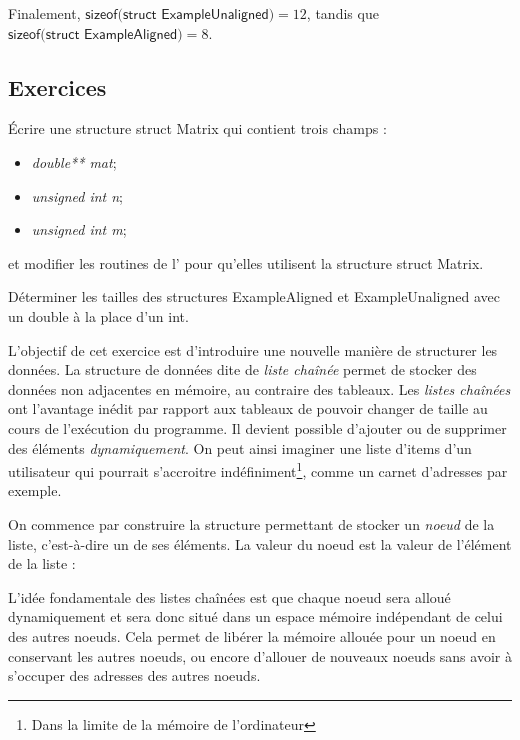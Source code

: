 \documentclass[../../../main.tex]{subfiles}
\begin{document}
Finalement, $\textsf{sizeof(struct ExampleUnaligned)} = 12$, tandis que $\textsf{sizeof(struct ExampleAligned)} = 8$.
\subsection{Exercices}
 Écrire une structure \textsf{struct Matrix} qui contient trois champs :
\begin{itemize}
	\item \textit{double** mat};
	\item \textit{unsigned int n};
	\item \textit{unsigned int m};
\end{itemize}
et modifier les routines de l' pour qu'elles utilisent la structure \textsf{struct Matrix}.

 Déterminer les tailles des structures \textsf{ExampleAligned} et \textsf{ExampleUnaligned} avec un \textsf{double} à la place d'un \textsf{int}.

L'objectif de cet exercice est d'introduire une nouvelle manière de structurer les données. La structure de données dite de \textit{liste chaînée} permet de stocker des données non adjacentes en mémoire, au contraire des tableaux. Les \textit{listes chaînées} ont l'avantage inédit par rapport aux tableaux de pouvoir changer de taille au cours de l'exécution du programme. Il devient possible d'ajouter ou de supprimer des éléments \textit{dynamiquement}. On peut ainsi imaginer une liste d'items d'un utilisateur qui pourrait s'accroitre indéfiniment\footnote{Dans la limite de la mémoire de l'ordinateur}, comme un carnet d'adresses par exemple.
 
On commence par construire la structure permettant de stocker un \textit{noeud} de la liste, c'est-à-dire un de ses éléments. La valeur du noeud est la valeur de l'élément de la liste :
 
\begin{minipage}{\textwidth}
	\begin{center}
		
		\label{img:node}
	\end{center}
\end{minipage}

L'idée fondamentale des listes chaînées est que chaque noeud sera alloué dynamiquement et sera donc situé dans un espace mémoire indépendant de celui des autres noeuds. Cela permet de libérer la mémoire allouée pour un noeud en conservant les autres noeuds, ou encore d'allouer de nouveaux noeuds sans avoir à s'occuper des adresses des autres noeuds.
\end{document}
